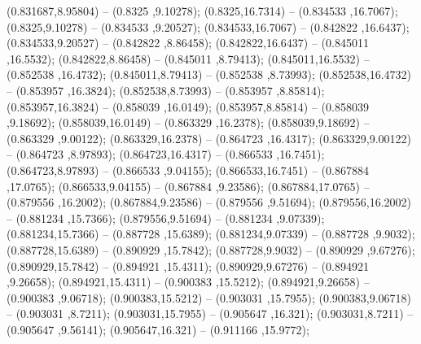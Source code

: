  (0.831687,8.95804) -- (0.8325 ,9.10278);
 (0.8325,16.7314) -- (0.834533 ,16.7067);
 (0.8325,9.10278) -- (0.834533 ,9.20527);
 (0.834533,16.7067) -- (0.842822 ,16.6437);
 (0.834533,9.20527) -- (0.842822 ,8.86458);
 (0.842822,16.6437) -- (0.845011 ,16.5532);
 (0.842822,8.86458) -- (0.845011 ,8.79413);
 (0.845011,16.5532) -- (0.852538 ,16.4732);
 (0.845011,8.79413) -- (0.852538 ,8.73993);
 (0.852538,16.4732) -- (0.853957 ,16.3824);
 (0.852538,8.73993) -- (0.853957 ,8.85814);
 (0.853957,16.3824) -- (0.858039 ,16.0149);
 (0.853957,8.85814) -- (0.858039 ,9.18692);
 (0.858039,16.0149) -- (0.863329 ,16.2378);
 (0.858039,9.18692) -- (0.863329 ,9.00122);
 (0.863329,16.2378) -- (0.864723 ,16.4317);
 (0.863329,9.00122) -- (0.864723 ,8.97893);
 (0.864723,16.4317) -- (0.866533 ,16.7451);
 (0.864723,8.97893) -- (0.866533 ,9.04155);
 (0.866533,16.7451) -- (0.867884 ,17.0765);
 (0.866533,9.04155) -- (0.867884 ,9.23586);
 (0.867884,17.0765) -- (0.879556 ,16.2002);
 (0.867884,9.23586) -- (0.879556 ,9.51694);
 (0.879556,16.2002) -- (0.881234 ,15.7366);
 (0.879556,9.51694) -- (0.881234 ,9.07339);
 (0.881234,15.7366) -- (0.887728 ,15.6389);
 (0.881234,9.07339) -- (0.887728 ,9.9032);
 (0.887728,15.6389) -- (0.890929 ,15.7842);
 (0.887728,9.9032) -- (0.890929 ,9.67276);
 (0.890929,15.7842) -- (0.894921 ,15.4311);
 (0.890929,9.67276) -- (0.894921 ,9.26658);
 (0.894921,15.4311) -- (0.900383 ,15.5212);
 (0.894921,9.26658) -- (0.900383 ,9.06718);
 (0.900383,15.5212) -- (0.903031 ,15.7955);
 (0.900383,9.06718) -- (0.903031 ,8.7211);
 (0.903031,15.7955) -- (0.905647 ,16.321);
 (0.903031,8.7211) -- (0.905647 ,9.56141);
 (0.905647,16.321) -- (0.911166 ,15.9772);
